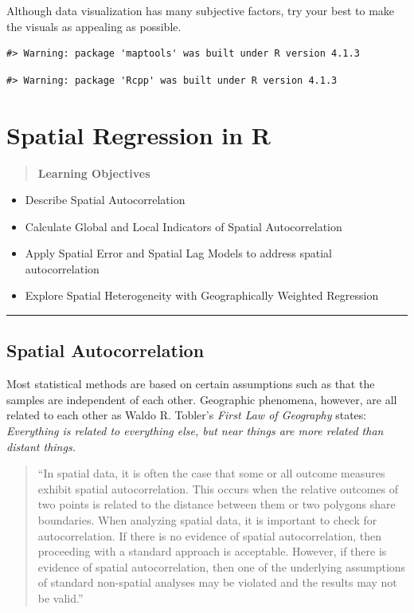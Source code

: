 \documentclass[
  11pt,
]{book}
\providecommand{\tightlist}{%
  \setlength{\itemsep}{0pt}\setlength{\parskip}{0pt}}
\begin{document}
Although data visualization has many subjective factors, try your best to make the visuals as appealing as possible.

\begin{verbatim}
#> Warning: package 'maptools' was built under R version 4.1.3
\end{verbatim}

\begin{verbatim}
#> Warning: package 'Rcpp' was built under R version 4.1.3
\end{verbatim}

\hypertarget{spregression}{%
\chapter{Spatial Regression in R}\label{spregression}}

\begin{quote}
\textbf{Learning Objectives}
\end{quote}

\begin{itemize}
\tightlist
\item
  Describe Spatial Autocorrelation
\item
  Calculate Global and Local Indicators of Spatial Autocorrelation
\item
  Apply Spatial Error and Spatial Lag Models to address spatial autocorrelation
\item
  Explore Spatial Heterogeneity with Geographically Weighted Regression
\end{itemize}

\begin{center}\rule{0.5\linewidth}{0.5pt}\end{center}

\hypertarget{spatial-autocorrelation}{%
\section{Spatial Autocorrelation}\label{spatial-autocorrelation}}

Most statistical methods are based on certain assumptions such as that the samples are independent of each other. Geographic phenomena, however, are all related to each other as Waldo R. Tobler's \emph{First Law of Geography} states: \emph{Everything is related to everything else, but near things are more related than distant things.}

\begin{quote}
``In spatial data, it is often the case that some or all outcome measures exhibit spatial autocorrelation. This occurs when the relative outcomes of two points is related to the distance between them or two polygons share boundaries. When analyzing spatial data, it is important to check for autocorrelation. If there is no evidence of spatial autocorrelation, then proceeding with a standard approach is acceptable. However, if there is evidence of spatial autocorrelation, then one of the underlying assumptions of standard non-spatial analyses may be violated and the results may not be valid.''
\end{quote}
\end{document}
